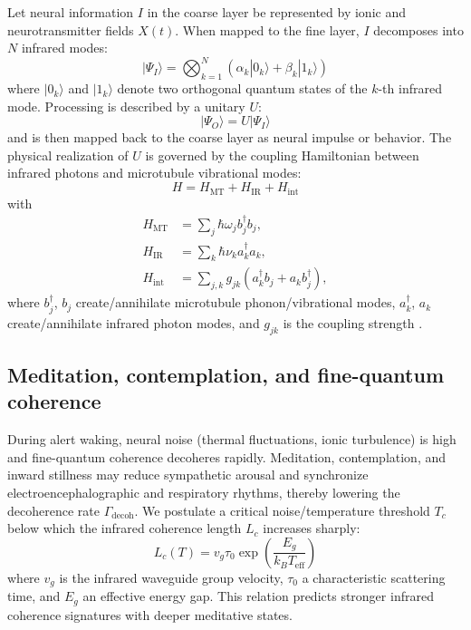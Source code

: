 \documentclass[11pt,a4paper]{article}
\begin{document}
Let neural information $I$ in the coarse layer be represented by ionic and neurotransmitter fields $X(t)$. When mapped to the fine layer, $I$ decomposes into $N$ infrared modes:
\begin{equation}
|\Psi_I\rangle = \bigotimes_{k=1}^{N} \left(\alpha_k |0_k\rangle + \beta_k |1_k\rangle\right)
\end{equation}
where $|0_k\rangle$ and $|1_k\rangle$ denote two orthogonal quantum states of the $k$-th infrared mode. Processing is described by a unitary $U$:
\begin{equation}
|\Psi_O\rangle = U |\Psi_I\rangle
\end{equation}
and is then mapped back to the coarse layer as neural impulse or behavior. The physical realization of $U$ is governed by the coupling Hamiltonian between infrared photons and microtubule vibrational modes:
\begin{equation}
H = H_{\text{MT}} + H_{\text{IR}} + H_{\text{int}}
\end{equation}
with
\begin{align}
H_{\text{MT}} &= \sum_j \hbar\omega_j b_j^\dagger b_j, \\
H_{\text{IR}} &= \sum_k \hbar\nu_k a_k^\dagger a_k, \\
H_{\text{int}} &= \sum_{j,k} g_{jk} \left(a_k^\dagger b_j + a_k b_j^\dagger\right),
\end{align}
where $b_j^\dagger$, $b_j$ create/annihilate microtubule phonon/vibrational modes, $a_k^\dagger$, $a_k$ create/annihilate infrared photon modes, and $g_{jk}$ is the coupling strength \cite{Pokorny2004,Lambert2013}.

\subsection{Meditation, contemplation, and fine-quantum coherence}

During alert waking, neural noise (thermal fluctuations, ionic turbulence) is high and fine-quantum coherence decoheres rapidly. Meditation, contemplation, and inward stillness may reduce sympathetic arousal and synchronize electroencephalographic and respiratory rhythms, thereby lowering the decoherence rate $\Gamma_{\text{decoh}}$. We postulate a critical noise/temperature threshold $T_c$ below which the infrared coherence length $L_c$ increases sharply:
\begin{equation}
L_c(T) = v_g \tau_0 \exp\left(\frac{E_g}{k_B T_{\text{eff}}}\right)
\label{eq:coherence}
\end{equation}
where $v_g$ is the infrared waveguide group velocity, $\tau_0$ a characteristic scattering time, and $E_g$ an effective energy gap. This relation predicts stronger infrared coherence signatures with deeper meditative states.
\end{document}
